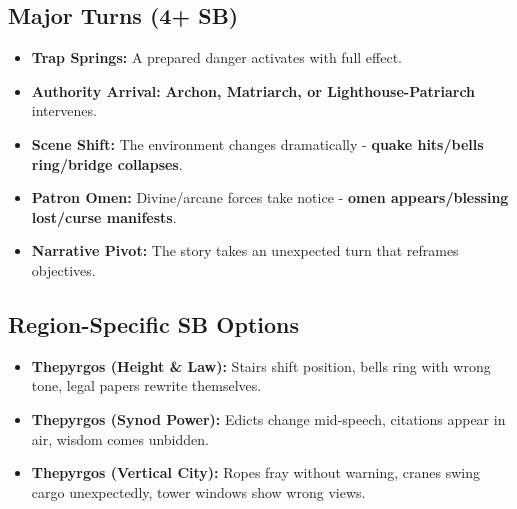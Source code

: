 \subsection*{Major Turns (4+ SB)}
\begin{itemize}
\item \textbf{Trap Springs:} A prepared danger activates with full effect.
\item \textbf{Authority Arrival:} \textbf{Archon, Matriarch, or Lighthouse-Patriarch} intervenes.
\item \textbf{Scene Shift:} The environment changes dramatically - \textbf{quake hits/bells ring/bridge collapses}.
\item \textbf{Patron Omen:} Divine/arcane forces take notice - \textbf{omen appears/blessing lost/curse manifests}.
\item \textbf{Narrative Pivot:} The story takes an unexpected turn that reframes objectives.
\end{itemize}

\subsection*{Region-Specific SB Options}
\begin{itemize}
\item \textbf{Thepyrgos (Height \& Law):} Stairs shift position, bells ring with wrong tone, legal papers rewrite themselves.
\item \textbf{Thepyrgos (Synod Power):} Edicts change mid-speech, citations appear in air, wisdom comes unbidden.
\item \textbf{Thepyrgos (Vertical City):} Ropes fray without warning, cranes swing cargo unexpectedly, tower windows show wrong views.
\end{itemize}
